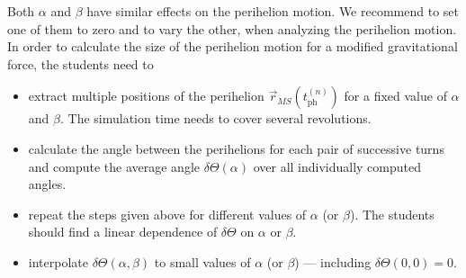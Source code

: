 \documentclass[12pt,ngerman,american]{iopart}
\begin{document}
Both $\alpha$ and $\beta$ have similar effects on the perihelion motion.
We recommend to set one of them to zero and to vary the other, when analyzing the perihelion motion. 
In order to calculate the size of the perihelion motion for a modified gravitational force, the students need to
\begin{itemize}
\item extract multiple positions of the perihelion $\vec r_{MS} ( t_\mathrm{ph}^{(n)} )$ for a fixed value of $\alpha$ and $\beta$. The  simulation time needs to cover several revolutions.
\item calculate the angle between the perihelions for each pair of successive turns and compute the average angle $\delta \Theta (\alpha)$ over all individually computed angles.
\item repeat the steps given above for different values of $\alpha$ (or $\beta$). The students should find a linear dependence of $\delta \Theta$ on $\alpha$ or $\beta$.
\item interpolate $\delta \Theta (\alpha, \beta)$ to small values of $\alpha$ (or $\beta$) --- including  $\delta \Theta(0,0)=0$.
\end{itemize}
\end{document}
